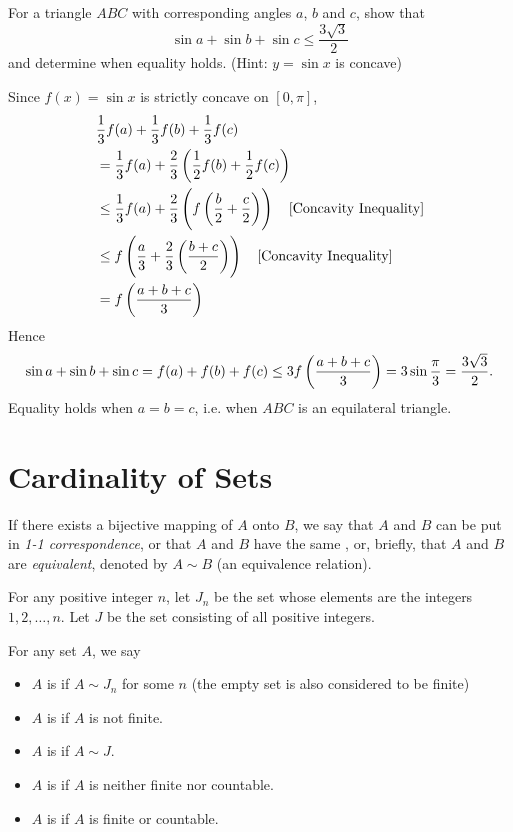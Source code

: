 \begin{exercise}{}{}
For a triangle $ABC$ with corresponding angles $a$, $b$ and $c$, show that
\[ \sin a+\sin b+\sin c\le\frac{3\sqrt{3}}{2} \]
and determine when equality holds. (Hint: $y=\sin x$ is concave)
\end{exercise}

\begin{solution}
Since $f(x)=\sin x$ is strictly concave on $[0,\pi]$,
\begin{align*}
&\frac{1}{3}f(a)+\frac{1}{3}f(b)+\frac{1}{3}f(c) \\
&= \frac{1}{3}f(a)+\frac{2}{3}\left(\frac{1}{2}f(b)+\frac{1}{2}f(c)\right) \\
&\le \frac{1}{3}f(a)+\frac{2}{3}\left(f\left(\frac{b}{2}+\frac{c}{2}\right)\right) \quad \text{[Concavity Inequality]} \\
&\le f\left(\frac{a}{3}+\frac{2}{3}\left(\frac{b+c}{2}\right)\right) \quad \text{[Concavity Inequality]} \\
&= f\left(\frac{a+b+c}{3}\right)
\end{align*}
Hence 
\[ \sin a+\sin b+\sin c=f(a)+f(b)+f(c)\le3f\left(\frac{a+b+c}{3}\right)=3\sin\frac{\pi}{3}=\frac{3\sqrt{3}}{2}. \]
Equality holds when $a=b=c$, i.e. when $ABC$ is an equilateral triangle.
\end{solution}
\pagebreak

\section{Cardinality of Sets}
\begin{definition}
If there exists a bijective mapping of $A$ onto $B$, we say that $A$ and $B$ can be put in \emph{1-1 correspondence}, or that $A$ and $B$ have the same , or, briefly, that $A$ and $B$ are \emph{equivalent}, denoted by $A\sim B$ (an equivalence relation). 
\end{definition}

\begin{notation}
For any positive integer $n$, let $J_n$ be the set whose elements are the integers $1,2,\dots,n$. Let $J$ be the set consisting of all positive integers. 
\end{notation}

\begin{definition}
For any set $A$, we say
\begin{itemize}
\item $A$ is  if $A\sim J_n$ for some $n$ (the empty set is also considered to be finite)
\item $A$ is  if $A$ is not finite.
\item $A$ is  if $A\sim J$.
\item $A$ is  if $A$ is neither finite nor countable.
\item $A$ is  if $A$ is finite or countable.
\end{itemize}
\end{definition}


